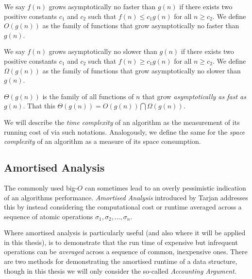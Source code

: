 \begin{definition}
    We say $f(n)$ grows asymptotically no faster than $g(n)$ if there exists two positive constants $c_1$ and $c_2$ such that $f(n)\leq c_1 g(n)$ for all $n\geq c_2$. We define $O(g(n))$ as the family of functions that grow asymptotically no faster than $g(n)$.
\end{definition}

\begin{definition}
    We say $f(n)$ grows asymptotically no slower than $g(n)$ if there exists two positive constants $c_1$ and $c_2$ such that $f(n)\geq c_1 g(n)$ for all $n\geq c_2$. We define $\Omega(g(n))$ as the family of functions that grow asymptotically no slower than $g(n)$.
\end{definition}

\begin{definition} $\Theta(g(n))$ is the family of all functions of $n$ that grow \textit{asymptotically as fast as $g(n)$}. That this $\Theta(g(n)) = O(g(n))\bigcap\Omega(g(n))$.
\end{definition}

We will describe the \textit{time complexity} of an algorithm as the measurement of its running cost of via such notations. Analogously, we define the same for the \textit{space complexity} of an algorithm as a measure of its space consumption. 

\subsection{Amortised Analysis}
\label{ssec:amortised-analysis}

The commonly used big-$O$ can sometimes lead to an overly pessimistic indication of an algorithms performance. \textit{Amortised Analysis} introduced by Tarjan \cite{doi:10.1137/0606031} addresses this by instead considering the computational cost or runtime averaged across a sequence of atomic operations $\sigma_1, \sigma_2, \dots, \sigma_n$. 

Where amortised analysis is particularly useful (and also where it will be applied in this thesis), is to demonstrate that the run time of expensive but infrequent operations can be \textit{averaged} across a sequence of common, inexpensive ones. There are two methods for demonstrating the amortised runtime of a data structure, though in this thesis we will only consider the so-called \textit{Accounting Argument.} 

